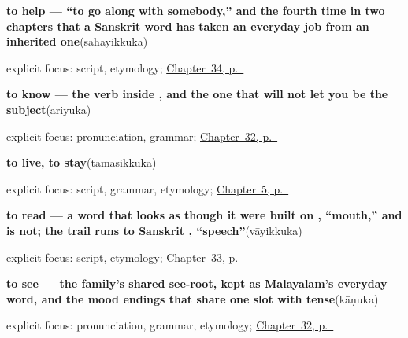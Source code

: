 \noindent\begin{minipage}[t]{\linewidth}
\raggedright
\textbf{to help — \textquotedblleft{}to go along with somebody,\textquotedblright{} and the fourth time in two chapters that a Sanskrit word has taken an everyday job from an inherited one}\enspace\emph{}\enspace(sahāyikkuka)\par
\footnotesize explicit focus: script, etymology; \hyperref[ch:ml-taking-asking-helping-liking]{Chapter~34, p.~\pageref*{ch:ml-taking-asking-helping-liking}}
\end{minipage}\par\smallskip

\noindent\begin{minipage}[t]{\linewidth}
\raggedright
\textbf{to know — the verb inside   , and the one that will not let you be the subject}\enspace\emph{}\enspace(aṟiyuka)\par
\footnotesize explicit focus: pronunciation, grammar; \hyperref[ch:ml-core-verbs]{Chapter~32, p.~\pageref*{ch:ml-core-verbs}}
\end{minipage}\par\smallskip

\noindent\begin{minipage}[t]{\linewidth}
\raggedright
\textbf{to live, to stay}\enspace\emph{}\enspace(tāmasikkuka)\par
\footnotesize explicit focus: script, grammar, etymology; \hyperref[ch:first-verbs]{Chapter~5, p.~\pageref*{ch:first-verbs}}
\end{minipage}\par\smallskip

\noindent\begin{minipage}[t]{\linewidth}
\raggedright
\textbf{to read — a word that looks as though it were built on , \textquotedblleft{}mouth,\textquotedblright{} and is not; the trail runs to Sanskrit , \textquotedblleft{}speech\textquotedblright{}}\enspace\emph{}\enspace(vāyikkuka)\par
\footnotesize explicit focus: script, etymology; \hyperref[ch:ml-mind-and-page]{Chapter~33, p.~\pageref*{ch:ml-mind-and-page}}
\end{minipage}\par\smallskip

\noindent\begin{minipage}[t]{\linewidth}
\raggedright
\textbf{to see — the family's shared see-root, kept as Malayalam's everyday word, and the mood endings that share one slot with tense}\enspace\emph{}\enspace(kāṇuka)\par
\footnotesize explicit focus: pronunciation, grammar, etymology; \hyperref[ch:ml-core-verbs]{Chapter~32, p.~\pageref*{ch:ml-core-verbs}}
\end{minipage}\par\smallskip

